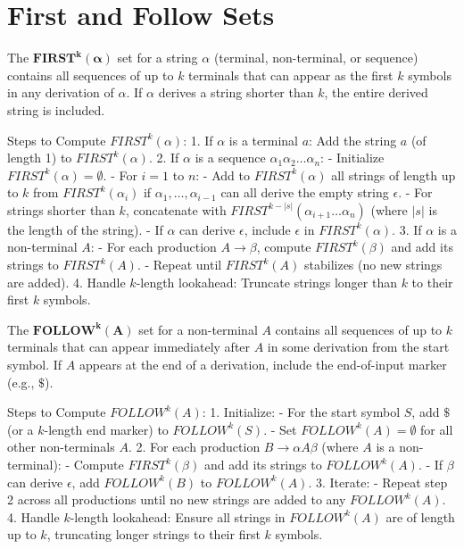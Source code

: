 
\section{First and Follow Sets}

The $\mathbf{FIRST^k(\alpha)}$ set for a string $\alpha$ (terminal, non-terminal, or sequence) contains all sequences of up to $k$ terminals that can appear as the first $k$ symbols in any derivation of $\alpha$. If $\alpha$ derives a string shorter than $k$, the entire derived string is included.

Steps to Compute $FIRST^k(\alpha)$:
1. If $\alpha$ is a terminal $a$: Add the string $a$ (of length 1) to $FIRST^k(\alpha)$.
2. If $\alpha$ is a sequence $\alpha_1 \alpha_2 \dots \alpha_n$:
   - Initialize $FIRST^k(\alpha) = \emptyset$.
   - For $i = 1$ to $n$:
     - Add to $FIRST^k(\alpha)$ all strings of length up to $k$ from $FIRST^k(\alpha_i)$ if $\alpha_1, \dots, \alpha_{i-1}$ can all derive the empty string $\epsilon$.
     - For strings shorter than $k$, concatenate with $FIRST^{k-|s|}(\alpha_{i+1} \dots \alpha_n)$ (where $|s|$ is the length of the string).
   - If $\alpha$ can derive $\epsilon$, include $\epsilon$ in $FIRST^k(\alpha)$.
3. If $\alpha$ is a non-terminal $A$:
   - For each production $A \to \beta$, compute $FIRST^k(\beta)$ and add its strings to $FIRST^k(A)$.
   - Repeat until $FIRST^k(A)$ stabilizes (no new strings are added).
4. Handle $k$-length lookahead: Truncate strings longer than $k$ to their first $k$ symbols.

The $\mathbf{FOLLOW^k(A)}$ set for a non-terminal $A$ contains all sequences of up to $k$ terminals that can appear immediately after $A$ in some derivation from the start symbol. If $A$ appears at the end of a derivation, include the end-of-input marker (e.g., $\$$).

Steps to Compute $FOLLOW^k(A)$:
1. Initialize:
   - For the start symbol $S$, add $\$$ (or a $k$-length end marker) to $FOLLOW^k(S)$.
   - Set $FOLLOW^k(A) = \emptyset$ for all other non-terminals $A$.
2. For each production $B \to \alpha A \beta$ (where $A$ is a non-terminal):
   - Compute $FIRST^k(\beta)$ and add its strings to $FOLLOW^k(A)$.
   - If $\beta$ can derive $\epsilon$, add $FOLLOW^k(B)$ to $FOLLOW^k(A)$.
3. Iterate:
   - Repeat step 2 across all productions until no new strings are added to any $FOLLOW^k(A)$.
4. Handle $k$-length lookahead: Ensure all strings in $FOLLOW^k(A)$ are of length up to $k$, truncating longer strings to their first $k$ symbols.
